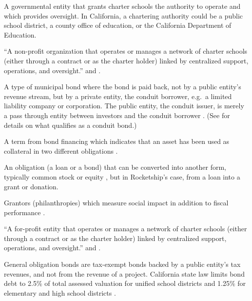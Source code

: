 \begin{description}[nosep]
\medskip\item[charter school authorizer] A governmental entity that grants charter schools the authority to operate and which provides oversight. In California, a chartering authority could be a public school district, a county office of education, or the California Department of Education. \parencite{NACSA2024}

\medskip\item[charter management organization (CMO)] ``A non-profit organization that operates or manages a network of charter schools (either through a contract or as the charter holder) linked by centralized support, operations, and oversight.'' \parencite[2]{USDoEd2021} and \parencite{CDE2021b}.

\medskip\item[conduit bond] A type of municipal bond where the bond is paid back, not by a public entity's revenue stream, but by a private entity, the conduit borrower, e.g. a limited liability company or corporation. The public entity, the conduit issuer, is merely a pass through entity between investors and the conduit borrower \parencite{Cooper2017}. (See \textcite{GASB91_2019} for details on what qualifies as a conduit bond.) %

\medskip\item[cross-collateralization] A term from bond financing which indicates that an asset has been used as collateral in two different obligations \parencite{Lipn.d.}.

\medskip\item[debt, convertible] An obligation (a loan or a bond) that can be converted into another form, typically common stock or equity \parencite{Chen2020}, but in Rocketship's case, from a loan into a grant or donation.

\medskip\item[double bottom line grantors] Grantors (philanthropies) which measure social impact in addition to fiscal performance \parencite{Clark.etal2015}.

\medskip\item[education management organization (EMO)] ``A for-profit entity that operates or manages a network of charter schools (either through a contract or as the charter holder) linked by centralized support, operations, and oversight.'' \parencite[2]{USDoEd2021} and \parencite{CDE2021b}. %

\medskip\item[general obligation bonds (GO)] General obligation bonds are tax-exempt bonds backed by a public entity's tax revenues, and not from the revenue of a project. California state law limits bond debt to 2.5\% of total assessed valuation for unified school districts and 1.25\% for elementary and high school districts \parencite{CDIAC2014}.


\end{description}

